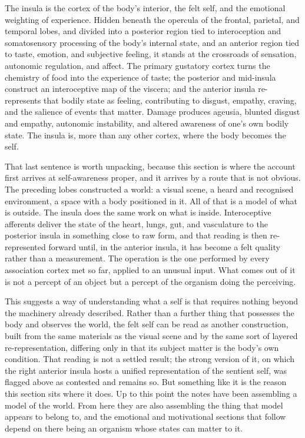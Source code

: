 \documentclass[11pt]{article}
\begin{document}
The insula is the cortex of the body's interior, the felt self, and the emotional weighting of experience. Hidden beneath the opercula of the frontal, parietal, and temporal lobes, and divided into a posterior region tied to interoception and somatosensory processing of the body's internal state, and an anterior region tied to taste, emotion, and subjective feeling, it stands at the crossroads of sensation, autonomic regulation, and affect. The primary gustatory cortex turns the chemistry of food into the experience of taste; the posterior and mid-insula construct an interoceptive map of the viscera; and the anterior insula re-represents that bodily state as feeling, contributing to disgust, empathy, craving, and the salience of events that matter. Damage produces ageusia, blunted disgust and empathy, autonomic instability, and altered awareness of one's own bodily state. The insula is, more than any other cortex, where the body becomes the self.

That last sentence is worth unpacking, because this section is where the account first arrives at self-awareness proper, and it arrives by a route that is not obvious. The preceding lobes constructed a world: a visual scene, a heard and recognised environment, a space with a body positioned in it. All of that is a model of what is outside. The insula does the same work on what is inside. Interoceptive afferents deliver the state of the heart, lungs, gut, and vasculature to the posterior insula in something close to raw form, and that reading is then re-represented forward until, in the anterior insula, it has become a felt quality rather than a measurement. The operation is the one performed by every association cortex met so far, applied to an unusual input. What comes out of it is not a percept of an object but a percept of the organism doing the perceiving.

This suggests a way of understanding what a self is that requires nothing beyond the machinery already described. Rather than a further thing that possesses the body and observes the world, the felt self can be read as another construction, built from the same materials as the visual scene and by the same sort of layered re-representation, differing only in that its subject matter is the body's own condition. That reading is not a settled result; the strong version of it, on which the right anterior insula hosts a unified representation of the sentient self, was flagged above as contested and remains so. But something like it is the reason this section sits where it does. Up to this point the notes have been assembling a model of the world. From here they are also assembling the thing that model appears to belong to, and the emotional and motivational sections that follow depend on there being an organism whose states can matter to it.
\end{document}
